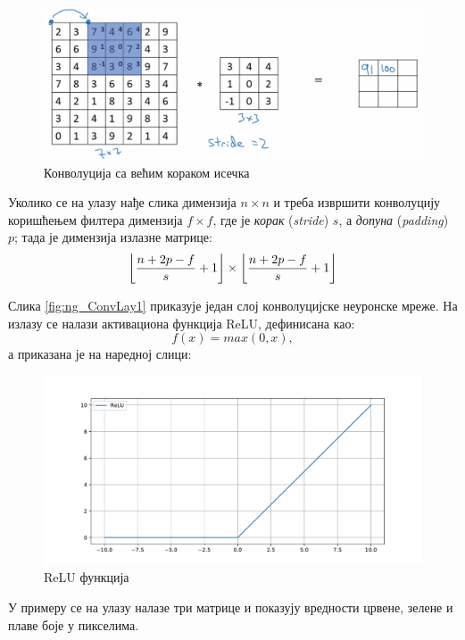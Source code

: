\documentclass[12pt, а4paper]{article}
\DeclarePairedDelimiter\floor{\lfloor}{\rfloor}
\begin{document}
\begin{figure}[H]
  \centering
      \includegraphics[scale=0.35]{slike/ngConvStride1.png}
  \caption{Конволуција са већим кораком исечка}
  \label{fig:ng_ConvStride1}
\end{figure}

Уколико се на улазу нађе слика димензија $n \times n$ и треба
извршити конволуцију коришћењем филтера димензија $f \times f$, где је
\textit{корак} (\textit{stride}) $s$, а \textit{допуна} (\textit{padding}) $p$;
тада је димензија излазне матрице:
\begin{equation*}
 \floor*{\frac{n+2p-f}{s}+1} \times \floor*{\frac{n+2p-f}{s}+1}
\end{equation*}

Слика \ref{fig:ng_ConvLay1} приказује један слој конволуцијске неуронске
мреже. На излазу се налази активациона функција ReLU, дефинисана као:
\begin{equation}
f(x) = max(0,x),
\end{equation}
а приказана је на наредној слици:

\begin{figure}[H]
  \centering
      \includegraphics[scale=0.35]{slike/ReLU.pdf}
  \caption{ReLU функција}
  \label{fig:ReLU}
\end{figure}

У примеру се на улазу налазе три матрице и показују вредности
црвене, зелене и плаве боје у пикселима. 
\end{document}
